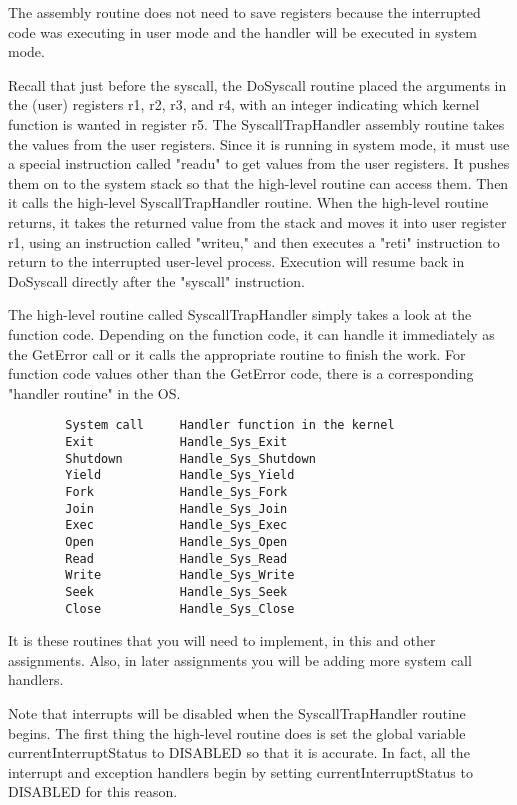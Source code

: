 \documentclass[12pt]{article}
\begin{document}
The assembly routine does not need to save registers because the
interrupted code was executing in user mode and the handler will be
executed in system mode.

Recall that just before the syscall, the DoSyscall routine placed the
arguments in the (user) registers r1, r2, r3, and r4, with an integer
indicating which kernel function is wanted in register r5.  The
SyscallTrapHandler assembly routine takes the values from the user
registers.  Since it is running in system mode, it must use a special
instruction called "readu" to get values from the user registers.  It
pushes them on to the system stack so that the high-level routine can
access them.  Then it calls the high-level SyscallTrapHandler routine.
When the high-level routine returns, it takes the returned value from
the stack and moves it into user register r1, using an instruction
called "writeu," and then executes a "reti" instruction to return to
the interrupted user-level process.  Execution will resume back in
DoSyscall directly after the "syscall" instruction.

The high-level routine called SyscallTrapHandler simply takes a look
at the function code.  Depending on the function code, it can handle
it immediately as the GetError call or it calls the appropriate
routine to finish the work. For function code values other than
the GetError code, there is a corresponding "handler routine" in the OS.

\begin{verbatim}
        System call     Handler function in the kernel
        Exit            Handle_Sys_Exit
        Shutdown        Handle_Sys_Shutdown
        Yield           Handle_Sys_Yield
        Fork            Handle_Sys_Fork
        Join            Handle_Sys_Join
        Exec            Handle_Sys_Exec
        Open            Handle_Sys_Open
        Read            Handle_Sys_Read
        Write           Handle_Sys_Write
        Seek            Handle_Sys_Seek
        Close           Handle_Sys_Close
\end{verbatim}

It is these routines that you will need to implement, in this and
other assignments.  Also, in later assignments you will be adding
more system call handlers.

Note that interrupts will be disabled when the SyscallTrapHandler
routine begins.  The first thing the high-level routine does is set
the global variable currentInterruptStatus to DISABLED so that it is
accurate.  In fact, all the interrupt and exception handlers begin by
setting currentInterruptStatus to DISABLED for this reason.
\end{document}
